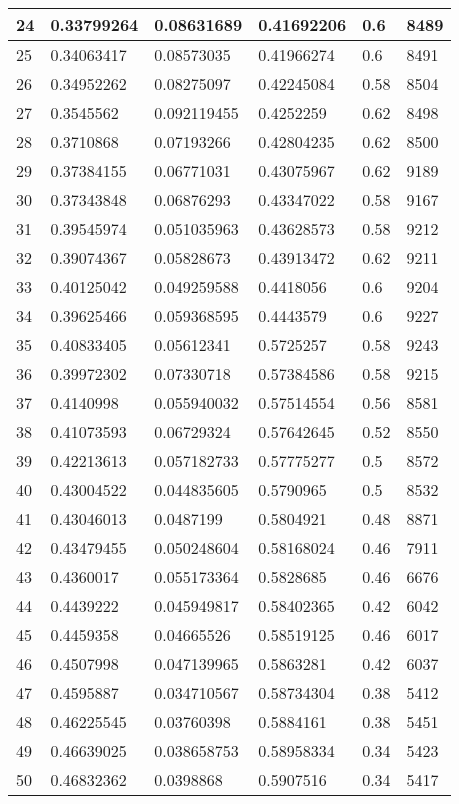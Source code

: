 \begin{longtable}{|l|l|l|l|l|l|}
24 & 0.33799264 & 0.08631689 & 0.41692206 & 0.6 & 8489 \\ \hline 
25 & 0.34063417 & 0.08573035 & 0.41966274 & 0.6 & 8491 \\ \hline 
26 & 0.34952262 & 0.08275097 & 0.42245084 & 0.58 & 8504 \\ \hline 
27 & 0.3545562 & 0.092119455 & 0.4252259 & 0.62 & 8498 \\ \hline 
28 & 0.3710868 & 0.07193266 & 0.42804235 & 0.62 & 8500 \\ \hline 
29 & 0.37384155 & 0.06771031 & 0.43075967 & 0.62 & 9189 \\ \hline 
30 & 0.37343848 & 0.06876293 & 0.43347022 & 0.58 & 9167 \\ \hline 
31 & 0.39545974 & 0.051035963 & 0.43628573 & 0.58 & 9212 \\ \hline 
32 & 0.39074367 & 0.05828673 & 0.43913472 & 0.62 & 9211 \\ \hline 
33 & 0.40125042 & 0.049259588 & 0.4418056 & 0.6 & 9204 \\ \hline 
34 & 0.39625466 & 0.059368595 & 0.4443579 & 0.6 & 9227 \\ \hline 
35 & 0.40833405 & 0.05612341 & 0.5725257 & 0.58 & 9243 \\ \hline 
36 & 0.39972302 & 0.07330718 & 0.57384586 & 0.58 & 9215 \\ \hline 
37 & 0.4140998 & 0.055940032 & 0.57514554 & 0.56 & 8581 \\ \hline 
38 & 0.41073593 & 0.06729324 & 0.57642645 & 0.52 & 8550 \\ \hline 
39 & 0.42213613 & 0.057182733 & 0.57775277 & 0.5 & 8572 \\ \hline 
40 & 0.43004522 & 0.044835605 & 0.5790965 & 0.5 & 8532 \\ \hline 
41 & 0.43046013 & 0.0487199 & 0.5804921 & 0.48 & 8871 \\ \hline 
42 & 0.43479455 & 0.050248604 & 0.58168024 & 0.46 & 7911 \\ \hline 
43 & 0.4360017 & 0.055173364 & 0.5828685 & 0.46 & 6676 \\ \hline 
44 & 0.4439222 & 0.045949817 & 0.58402365 & 0.42 & 6042 \\ \hline 
45 & 0.4459358 & 0.04665526 & 0.58519125 & 0.46 & 6017 \\ \hline 
46 & 0.4507998 & 0.047139965 & 0.5863281 & 0.42 & 6037 \\ \hline 
47 & 0.4595887 & 0.034710567 & 0.58734304 & 0.38 & 5412 \\ \hline 
48 & 0.46225545 & 0.03760398 & 0.5884161 & 0.38 & 5451 \\ \hline 
49 & 0.46639025 & 0.038658753 & 0.58958334 & 0.34 & 5423 \\ \hline 
50 & 0.46832362 & 0.0398868 & 0.5907516 & 0.34 & 5417 \\ \hline 
\end{longtable}